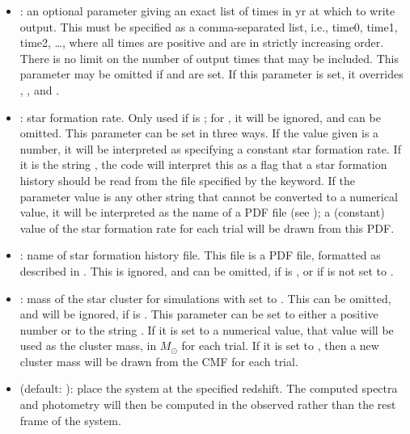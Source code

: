 \documentclass[letterpaper,10pt,english]{sphinxmanual}
\begin{document}
\begin{itemize}
\item {} 
: an optional parameter giving an exact list of times in yr at which to write output. This must be specified as a comma-separated list, i.e., time0, time1, time2, …, where all times are positive and are in strictly increasing order. There is no limit on the number of output times that may be included. This parameter may be omitted if  and  are set. If this parameter is set, it overrides , , and .

\item {} 
: star formation rate. Only used if  is ; for , it will be ignored, and can be omitted. This parameter can be set in three ways. If the value given is a number, it will be interpreted as specifying a constant star formation rate. If it is the string , the code will interpret this as a flag that a star formation history should be read from the file specified by the  keyword. If the parameter value is any other string that cannot be converted to a numerical value, it will be interpreted as the name of a PDF file (see {\hyperref[\detokenize{pdfs:sec-pdfs}]{}}); a (constant) value of the star formation rate for each trial will be drawn from this PDF.

\item {} 
: name of star formation history file. This file is a PDF file, formatted as described in {\hyperref[\detokenize{pdfs:sec-pdfs}]{}}. This is ignored, and can be omitted, if  is , or if  is not set to .

\item {} 
: mass of the star cluster for simulations with  set to . This can be omitted, and will be ignored, if  is . This parameter can be set to either a positive number or to the string . If it is set to a numerical value, that value will be used as the cluster mass, in \(M_\odot\) for each trial. If it is set to , then a new cluster mass will be drawn from the CMF for each trial.

\item {} 
 (default: ): place the system at the specified redshift. The computed spectra and photometry will then be computed in the observed rather than the rest frame of the system.

\end{itemize}
\end{document}
